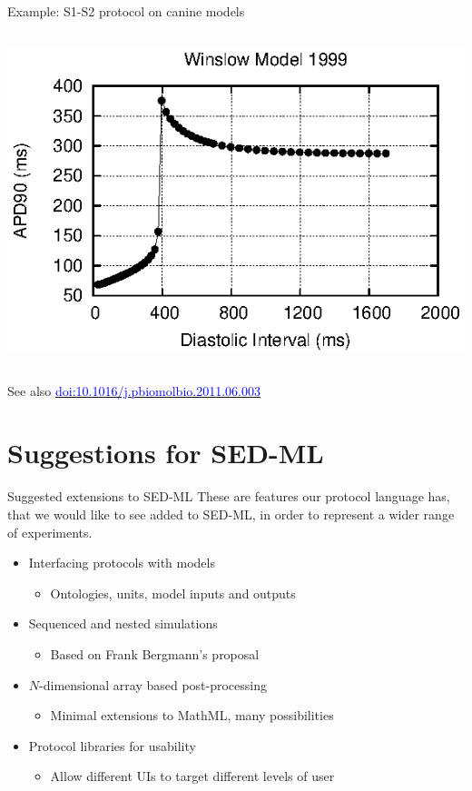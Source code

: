 \documentclass[t,xcolor={usenames,dvipsnames}]{beamer}
\newcommand{\myhref}[2]{\href{#1}{\textcolor{Blue}{#2}}}
\newcommand{\doi}[1]{\myhref{http://dx.doi.org/#1}{doi:#1}}
\newcommand{\subitem}[1]{\begin{itemize}[<.->]\item #1 \end{itemize}}
\begin{document}
\begin{frame}{Example: S1-S2 protocol on canine models}
\begin{columns}[T]
\begin{column}{.33\linewidth}
\begin{center}
\vspace{.1cm}
\includegraphics[width=\textwidth]{winslow_model_1999_s1s2_curve}
\end{center}
\end{column}
\end{columns}
\vspace{.3cm}
\scriptsize{See also \doi{10.1016/j.pbiomolbio.2011.06.003}}
\end{frame}


\section{Suggestions for SED-ML}


\begin{frame}{Suggested extensions to SED-ML}
These are features our protocol language has, that we would like to see added to SED-ML, in order to represent a wider range of experiments.
\begin{itemize}[<+->]
\item Interfacing protocols with models
  \subitem{Ontologies, units, model inputs and outputs}
\item Sequenced and nested simulations
  \subitem{Based on Frank Bergmann's proposal}
\item $N$-dimensional array based post-processing
  \subitem{Minimal extensions to MathML, many possibilities}
\item Protocol libraries for usability
  \subitem{Allow different UIs to target different levels of user}
\end{itemize}
\end{frame}
\end{document}
